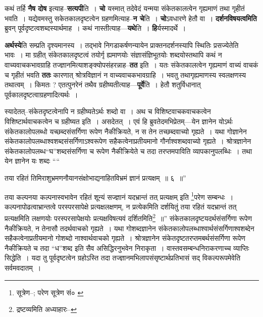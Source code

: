 \documentclass[article,12pt,a4paper]{memoir}
\begin{document}
	  \pstart कथं तर्हि \textbf{नैष दोष} इत्याह--\textbf{सत्यपी}ति । \textbf{चो} यस्मात् तदेवेदं यन्मया संकेतकालत्वेन गृह्यमाणं तथा गृहीतं भवति । यद्येवमस्तु सकेतकालदृष्टत्वेन ग्रहणमित्याह--\textbf{न चे}ति । \textbf{चो}ऽवधारणे हेतौ वा । \textbf{दर्शनविषयत्वमिति} ब्रुवन् पूर्वदृष्टत्वशब्दस्यार्थमाह । कथं नास्तीत्याह—\textbf{यथे}ति । \textbf{हि}र्यस्मादर्थे ।
	\pend
      

	  \pstart \textbf{अर्थस्ये}ति सम्प्रति दृश्यमानस्य । तद्भावे निगडाकर्षणन्यायेन प्राक्तनदर्शनस्यापि स्थितिः प्रसज्येतेति भावः । मा ग्रहीत् संकेतकालदृष्टत्वं तयोर्गृ ह्यमाणयोः संज्ञासंज्ञिभूतयोः शब्दयोस्तथापि कथं न वाच्यवाचकभावग्राहि तज्ज्ञानमित्याशङ्क्योपसंहरन्नाह--\textbf{तत} इति । यतः संकेतकालत्वेन गृह्यमाणं वाच्यं वाचकं च गृहीतं भवति \textbf{ततः} कारणात् श्रोत्रविज्ञानं न वाच्यवाचकभावग्राहि । भवतु तथागृह्यमाणस्य स्वलक्षणस्य तथात्वम् । किमतः ? एतत्पुनरेनं तथैव ग्रहीष्यतीत्याह—\textbf{पूर्वे}ति । हेतौ शतुर्विधानात् पूर्वकालदृष्टत्वाग्रहणादित्यर्थः ।
	\pend
      

	  \pstart स्यादेतत्--संकेतदृष्टत्वेनापि न ग्रहीष्यतेऽर्थः शब्दो वा । अथ च विशिष्टवाचकवाचकत्वेन विशिष्टार्थवाचकत्वेन च ग्रहीष्यत इति । असदेतत् । एवं हि ब्रुवतेदमभिप्रेतम्—येन ज्ञानेन योऽर्थः संकेतकालोपलब्धो यच्छब्दसंसर्गिणा रूपेण नैकीक्रियते, न स तेन तच्छब्दवाच्यो गृह्यते । यथा गोज्ञानेन संकेतकालोपलब्धाश्वशब्दसंसर्गिणाऽश्वरूपेण सहैकत्वेनाप्रतीयमानो गौर्नाश्वशब्दवाच्यो गृह्यते । श्रोत्रज्ञानेन संकेतकालोपलब्ध“घ”शब्दसंसर्गिणा च रूपेण नैकीक्रियेते च तदा तरप्तमपाविति व्यापकानुपलब्धिः । तथा येन ज्ञानेन यः शब्दः  \leavevmode{} ““
	  
	तया रहितं तिमिराशुभ्रमणनौयानसंक्षोभाद्यनाहितविभ्रमं ज्ञानं प्रत्यक्षम् ॥ ६ ॥” 
	  
	तया कल्पनया कल्पनास्वभावेन रहितं शून्यं सज्ज्ञानं यदभ्रान्तं तत् प्रत्यक्षम् इति \footnote{सूत्रेण--\cite{dp-msD-n}; परेण सूत्रेण सं० \cite{dp-msB}}परेण सम्बन्धः । कल्पनापोढत्वाभ्रान्तत्वे परस्परसापेक्षे प्रत्यक्षलक्षणम्, न प्रत्येकमिति दर्शयितुं तया रहितं यदभ्रान्तं तत् प्रत्यक्षमिति लक्षणयोः परस्परसापेक्षयोः प्रत्यक्षविषत्यवं दर्शितमिति\footnote{द्रष्टव्यमिति अध्याहारः--\cite{dp-msD-n}} ॥” संकेतकालदृष्टयदर्थसंसर्गिणा रूपेण नैकीक्रियते, न तेनासौ तदर्थवाचको गृह्यते । यथा गोशब्दज्ञानेन संकेतकालोपलब्धाश्वार्थसंसर्गिणाश्वशब्देन सहैकत्वेनाप्रतीयमानो गोशब्दो नाश्वार्थवाचको गृह्यते । श्रोत्रज्ञानेन संकेतदृष्टतरप्तमबर्थसंसर्गिणा रूपेण नैकीक्रियते च तदा “ध”शब्द इति सैव असिद्धिरनुभवेन निराकृता । वास्तवसम्बन्धनिराकरणाच्च व्याप्तिः सिद्धेति । यदा तु पूर्वदृष्टत्वेन ग्रहोऽस्ति तदा तज्ज्ञानमभिलापसंसृष्टार्थप्रतिभासं सद् विकल्परूपमेवेति सर्वमवदातम् ।
	\pend
      
\end{document}
